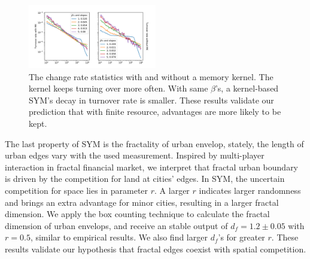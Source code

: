 \documentclass[reprint,unsortedaddress,amsmath,amssymb,aps,prl,showkeys]{revtex4-2}
\begin{document}
\begin{figure}
	\centering
	\includegraphics[width = 0.5\textwidth]{pics/in_one_now_now.pdf}
	\caption{The change rate statistics with and without a memory kernel. The kernel keeps turning over more often. With same $\beta$'s, a kernel-based SYM's decay in turnover rate is smaller. These results validate our prediction that with finite resource, advantages are more likely to be kept.}
	\label{changerate}
\end{figure}

The last property of SYM is the fractality of urban envelop, stately, the length of urban edges vary with the used measurement. Inspired by multi-player interaction in fractal financial market\cite{PhysRevE.65.037106}, we interpret that fractal urban boundary is driven by the competition for land at cities' edges. In SYM, the uncertain competition for space lies in parameter $r$. A larger $r$ indicates larger randomness and brings an extra advantage for minor cities, resulting in a larger fractal dimension. We apply the box counting technique to calculate the fractal dimension of urban envelops, and receive an stable output of $d_f = 1.2\pm 0.05$ with $r = 0.5$, similar to empirical results\cite{batty1992form}. We also find larger $d_f$'s for greater $r$. These results validate our hypothesis that fractal edges coexist with spatial competition. 


\end{document}
